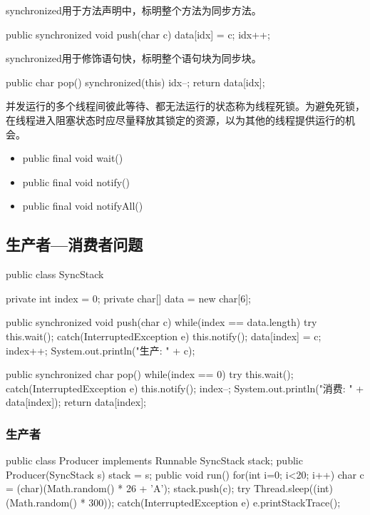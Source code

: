 synchronized用于方法声明中，标明整个方法为同步方法。

\begin{javaCode}
public synchronized void push(char c) {
  data[idx] = c;
  idx++;
}
\end{javaCode}

synchronized用于修饰语句快，标明整个语句块为同步块。

\begin{javaCode}
public char pop() {
  synchronized(this) {
    idx--;
    return data[idx];
  }
}
\end{javaCode}


并发运行的多个线程间彼此等待、都无法运行的状态称为线程死锁。为避免死锁，
在线程进入阻塞状态时应尽量释放其锁定的资源，以为其他的线程提供运行的机
会。

\begin{itemize}
\item public final void wait()
\item public final void notify()
\item public final void notifyAll()
\end{itemize}

\subsection{生产者—消费者问题}

\begin{javaCode}
public class SyncStack {
  private int index = 0;
  private char[] data = new char[6];

  public synchronized void push(char c) {
    while(index == data.length) {
      try {
        this.wait();
      } catch(InterruptedException e) {
      }
    }
    this.notify();
    data[index] = c;
    index++;
    System.out.println("生产: " + c);
  }
  
  public synchronized char pop() {
    while(index == 0) {
      try {
        this.wait();
      } catch(InterruptedException e) {
      }
    }
    this.notify();
    index--;
    System.out.println("消费: " + data[index]);
    return data[index];
  }
}
\end{javaCode}

\subsubsection{生产者}
  
\begin{javaCode}
  public class Producer implements Runnable {
    SyncStack stack;
    public Producer(SyncStack s) {
      stack = s;
    }
    public void run() {
      for(int i=0; i<20; i++) {
        char c = (char)(Math.random() * 26 + 'A');
        stack.push(c);
        try {
          Thread.sleep((int)(Math.random() * 300));
        } catch(InterruptedException e) {
          e.printStackTrace();
        }
      }
    }
  }    
\end{javaCode}

